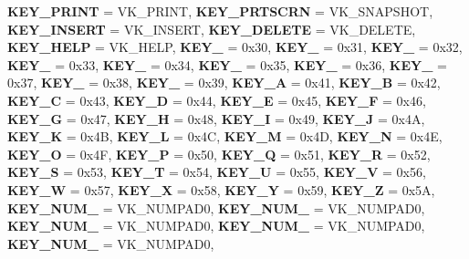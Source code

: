 \begin{DoxyCompactItemize}
{\bfseries K\+E\+Y\+\_\+\+P\+R\+I\+NT} = V\+K\+\_\+\+P\+R\+I\+NT, 
\newline
{\bfseries K\+E\+Y\+\_\+\+P\+R\+T\+S\+C\+RN} = V\+K\+\_\+\+S\+N\+A\+P\+S\+H\+OT, 
{\bfseries K\+E\+Y\+\_\+\+I\+N\+S\+E\+RT} = V\+K\+\_\+\+I\+N\+S\+E\+RT, 
{\bfseries K\+E\+Y\+\_\+\+D\+E\+L\+E\+TE} = V\+K\+\_\+\+D\+E\+L\+E\+TE, 
{\bfseries K\+E\+Y\+\_\+\+H\+E\+LP} = V\+K\+\_\+\+H\+E\+LP, 
\newline
{\bfseries K\+E\+Y\+\_} = 0x30, 
{\bfseries K\+E\+Y\+\_} = 0x31, 
{\bfseries K\+E\+Y\+\_} = 0x32, 
{\bfseries K\+E\+Y\+\_} = 0x33, 
\newline
{\bfseries K\+E\+Y\+\_} = 0x34, 
{\bfseries K\+E\+Y\+\_} = 0x35, 
{\bfseries K\+E\+Y\+\_} = 0x36, 
{\bfseries K\+E\+Y\+\_} = 0x37, 
\newline
{\bfseries K\+E\+Y\+\_} = 0x38, 
{\bfseries K\+E\+Y\+\_} = 0x39, 
{\bfseries K\+E\+Y\+\_\+A} = 0x41, 
{\bfseries K\+E\+Y\+\_\+B} = 0x42, 
\newline
{\bfseries K\+E\+Y\+\_\+C} = 0x43, 
{\bfseries K\+E\+Y\+\_\+D} = 0x44, 
{\bfseries K\+E\+Y\+\_\+E} = 0x45, 
{\bfseries K\+E\+Y\+\_\+F} = 0x46, 
\newline
{\bfseries K\+E\+Y\+\_\+G} = 0x47, 
{\bfseries K\+E\+Y\+\_\+H} = 0x48, 
{\bfseries K\+E\+Y\+\_\+I} = 0x49, 
{\bfseries K\+E\+Y\+\_\+J} = 0x4A, 
\newline
{\bfseries K\+E\+Y\+\_\+K} = 0x4B, 
{\bfseries K\+E\+Y\+\_\+L} = 0x4C, 
{\bfseries K\+E\+Y\+\_\+M} = 0x4D, 
{\bfseries K\+E\+Y\+\_\+N} = 0x4E, 
\newline
{\bfseries K\+E\+Y\+\_\+O} = 0x4F, 
{\bfseries K\+E\+Y\+\_\+P} = 0x50, 
{\bfseries K\+E\+Y\+\_\+Q} = 0x51, 
{\bfseries K\+E\+Y\+\_\+R} = 0x52, 
\newline
{\bfseries K\+E\+Y\+\_\+S} = 0x53, 
{\bfseries K\+E\+Y\+\_\+T} = 0x54, 
{\bfseries K\+E\+Y\+\_\+U} = 0x55, 
{\bfseries K\+E\+Y\+\_\+V} = 0x56, 
\newline
{\bfseries K\+E\+Y\+\_\+W} = 0x57, 
{\bfseries K\+E\+Y\+\_\+X} = 0x58, 
{\bfseries K\+E\+Y\+\_\+Y} = 0x59, 
{\bfseries K\+E\+Y\+\_\+Z} = 0x5A, 
\newline
{\bfseries K\+E\+Y\+\_\+\+N\+U\+M\+\_} = V\+K\+\_\+\+N\+U\+M\+P\+A\+D0, 
{\bfseries K\+E\+Y\+\_\+\+N\+U\+M\+\_} = V\+K\+\_\+\+N\+U\+M\+P\+A\+D0, 
{\bfseries K\+E\+Y\+\_\+\+N\+U\+M\+\_} = V\+K\+\_\+\+N\+U\+M\+P\+A\+D0, 
{\bfseries K\+E\+Y\+\_\+\+N\+U\+M\+\_} = V\+K\+\_\+\+N\+U\+M\+P\+A\+D0, 
\newline
{\bfseries K\+E\+Y\+\_\+\+N\+U\+M\+\_} = V\+K\+\_\+\+N\+U\+M\+P\+A\+D0, 

\end{DoxyCompactItemize}
